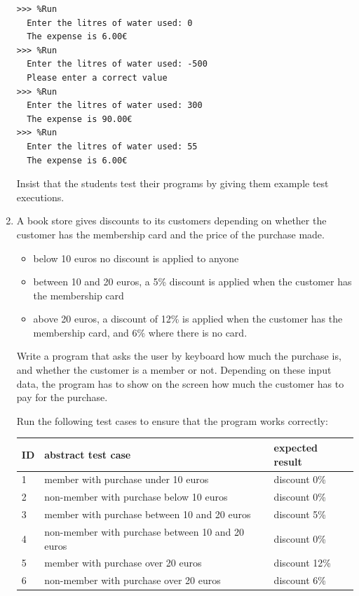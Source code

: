 \documentclass[
  fontsize=10pt,
  a4paper,
]{scrartcl}
\newenvironment{howTILEd}%
  {\begin{mdframed}[skipabove=10pt,skipbelow=10pt,backgroundcolor=pink!40]}%
  {\end{mdframed}}
\begin{document}
\begin{enumerate}
\begin{small}
\begin{Verbatim}[frame=single, label={\em examples of test executions}]
>>> %Run 
  Enter the litres of water used: 0
  The expense is 6.00€
>>> %Run 
  Enter the litres of water used: -500
  Please enter a correct value
>>> %Run 
  Enter the litres of water used: 300
  The expense is 90.00€
>>> %Run 
  Enter the litres of water used: 55
  The expense is 6.00€
\end{Verbatim}
\end{small}

\begin{howTILEd}
Insist that the students test their programs by giving them example test executions. 
\end{howTILEd}


\item A book store gives discounts to its customers depending on whether the customer has the membership card and the price of the purchase made.

\begin{itemize}
\item below 10 euros no discount is applied to anyone
\item between 10 and 20 euros, a 5\% discount is applied when the customer has the membership card
\item above 20 euros, a discount of 12\% is applied when the customer has the membership card, and 6\% where there is no card.
\end{itemize}

Write a program that asks the user by keyboard how much the purchase is, and whether the customer is a member or not. Depending on these input data, the program has to show on the screen how much the customer has to pay for the purchase.

Run the following test cases to ensure that the program works correctly:

\begin{tabular}{|l|l|l|}
\hline
ID & abstract test case & expected result\\
\hline\hline
1 & member with purchase under 10 euros & discount 0\%\\
2 & non-member with purchase below 10 euros & discount 0\%\\
3 & member with purchase between 10 and 20 euros & discount 5\%\\
4 & non-member with purchase between 10 and 20 euros & discount 0\%\\
5 & member with purchase over 20 euros & discount 12\%\\
6 & non-member with purchase over 20 euros & discount 6\%\\
\hline
\end{tabular}


\end{enumerate}
\end{document}
